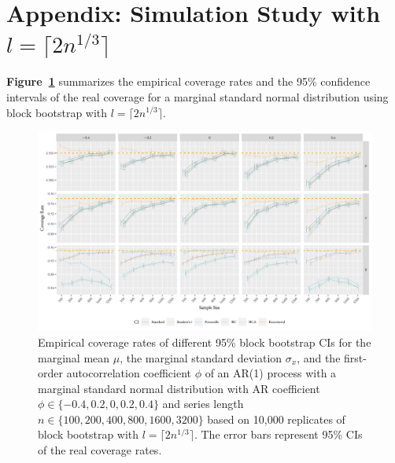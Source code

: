 \documentclass[10pt]{article}
\begin{document}
\section*{Appendix: Simulation Study with $l = \lceil 2n^{1/3} \rceil$}

\textbf{Figure~\ref{fig:norm2}} 
summarizes the empirical coverage rates and the 95\% confidence intervals of the 
real coverage for a marginal standard normal distribution using block bootstrap
with $l = \lceil 2n^{1/3} \rceil$.

\begin{figure}[tbp]
  \centering
  \includegraphics[width=\textwidth]{figures/alt_plot_norm2}
  \caption{Empirical coverage rates of different 95\% block bootstrap CIs for
    the marginal mean $\mu$, the marginal standard deviation $\sigma_x$, and
    the first-order autocorrelation coefficient $\phi$ of an AR(1) process with 
    a marginal standard 
    normal distribution with AR coefficient
    $\phi \in \{-0.4, 0.2, 0, 0.2, 0.4\}$ and series length
    $n \in \{100, 200, 400, 800, 1600, 3200\}$ based on 10,000 replicates of
    block bootstrap with $l = \lceil 2n^{1/3} \rceil$. The
    error bars represent 95\% CIs of the real coverage rates.}
  \label{fig:norm2}
\end{figure}
\end{document}
